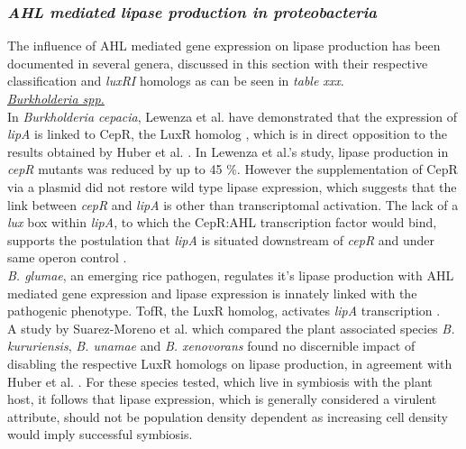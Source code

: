 \documentclass[twoside]{article}
\begin{document}
\subsubsection{\emph{AHL mediated lipase production in proteobacteria}}
The influence of AHL mediated gene expression on lipase production has been documented in several genera, discussed in this section with their respective classification and \emph{luxRI} homologs as can be seen in \emph{table xxx}.\\


\emph{\underline{Burkholderia spp.}} 
\\In \emph{Burkholderia cepacia}, Lewenza et al. have demonstrated that the expression of \emph{lipA} is linked to CepR, the LuxR homolog \cite{lewenza1999}, which is in direct opposition to the results obtained by Huber et al. \cite{huber2001}. In Lewenza et al.'s study, lipase production in \emph{cepR} mutants was reduced by up to 45 \%. However the supplementation of CepR via a plasmid did not restore wild type lipase expression, which suggests that the link between \emph{cepR} and \emph{lipA} is other than transcriptomal activation. The lack of a \emph{lux} box within \emph{lipA}, to which the CepR:AHL transcription factor would bind, supports the postulation that \emph{lipA} is situated downstream of \emph{cepR} and under same operon control \cite{lewenza1999}.\\



\emph{B. glumae}, an emerging rice pathogen, regulates it's lipase production with AHL mediated gene expression and lipase expression is innately linked with the pathogenic phenotype. TofR, the LuxR homolog, activates \emph{lipA} transcription \cite{devescovi_07}. \\


A study by Suarez-Moreno et al. which compared the plant associated species \emph{B. kururiensis}, \emph{B. unamae} and \emph{B. xenovorans} found no discernible impact of disabling the respective LuxR homologs on lipase production, in agreement with Huber et al. \cite{huber2001,suarez2010}. For these species tested, which live in symbiosis with the plant host, it follows that lipase expression, which is generally considered a virulent attribute, should not be population density dependent as increasing cell density would imply successful symbiosis. \\
\end{document}
